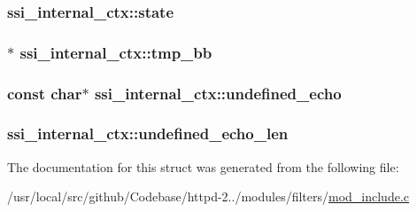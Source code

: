\subsubsection[{\texorpdfstring{state}{state}}]{ ssi\+\_\+internal\+\_\+ctx\+::state}\hypertarget{structssi__internal__ctx_a3eebdb88ceb5ae56f2446bbb2685324d}{}\label{structssi__internal__ctx_a3eebdb88ceb5ae56f2446bbb2685324d}
\subsubsection[{\texorpdfstring{tmp\+\_\+bb}{tmp_bb}}]{$\ast$ ssi\+\_\+internal\+\_\+ctx\+::tmp\+\_\+bb}\hypertarget{structssi__internal__ctx_acbfa5e6a3dc6ee1e887978007d9c0a97}{}\label{structssi__internal__ctx_acbfa5e6a3dc6ee1e887978007d9c0a97}
\subsubsection[{\texorpdfstring{undefined\+\_\+echo}{undefined_echo}}]{\setlength{\rightskip}{0pt plus 5cm}const char$\ast$ ssi\+\_\+internal\+\_\+ctx\+::undefined\+\_\+echo}\hypertarget{structssi__internal__ctx_ae863f69a7cdee939d87b5a3fbb58cc19}{}\label{structssi__internal__ctx_ae863f69a7cdee939d87b5a3fbb58cc19}
\subsubsection[{\texorpdfstring{undefined\+\_\+echo\+\_\+len}{undefined_echo_len}}]{ ssi\+\_\+internal\+\_\+ctx\+::undefined\+\_\+echo\+\_\+len}\hypertarget{structssi__internal__ctx_aeac0930b053a13bb3bb740ff316f1cd5}{}\label{structssi__internal__ctx_aeac0930b053a13bb3bb740ff316f1cd5}


The documentation for this struct was generated from the following file\+:\begin{DoxyCompactItemize}
\item 
/usr/local/src/github/\+Codebase/httpd-\/2../modules/filters/\hyperlink{mod__include_8c}{mod\+\_\+include.\+c}\end{DoxyCompactItemize}
